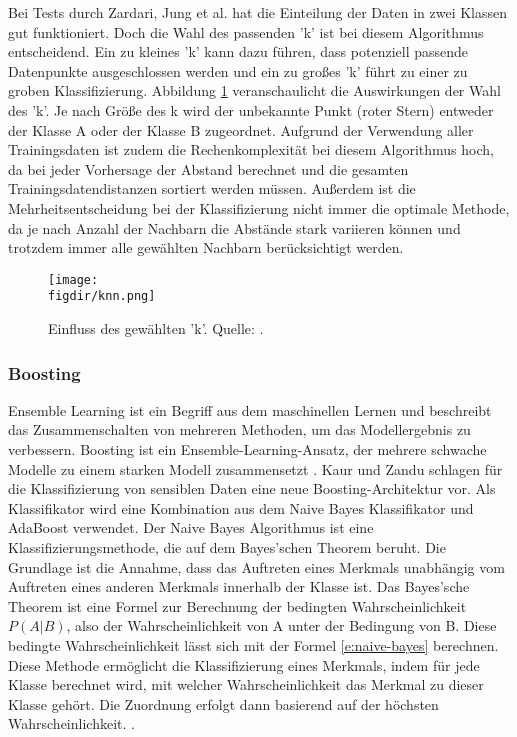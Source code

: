 Bei Tests durch Zardari, Jung et al. \cite{Zardari.2014} hat die Einteilung der Daten in zwei Klassen gut funktioniert. Doch die Wahl des passenden 'k' ist bei diesem Algorithmus entscheidend. Ein zu kleines 'k' kann dazu führen, dass potenziell passende Datenpunkte ausgeschlossen werden und ein zu großes 'k' führt zu einer zu groben Klassifizierung. Abbildung \ref{f:knn} veranschaulicht die Auswirkungen der Wahl des 'k'. Je nach Größe des k wird der unbekannte Punkt (roter Stern) entweder der Klasse A oder der Klasse B zugeordnet. Aufgrund der Verwendung aller Trainingsdaten ist zudem die Rechenkomplexität bei diesem Algorithmus hoch, da bei jeder Vorhersage der Abstand berechnet und die gesamten Trainingsdatendistanzen sortiert werden müssen. Außerdem ist die Mehrheitsentscheidung bei der Klassifizierung nicht immer die optimale Methode, da je nach Anzahl der Nachbarn die Abstände stark variieren können und trotzdem immer alle gewählten Nachbarn berücksichtigt werden.

\begin{figure}[htbp]
    \centering
    \texttt{[image: \\figdir/knn.png]}
    \caption{Einfluss des gewählten 'k'. Quelle: \cite{Shah.03.03.2021}.}
    \label{f:knn}
\end{figure}


\subsubsection{Boosting}
Ensemble Learning ist ein Begriff aus dem maschinellen Lernen und beschreibt das Zusammenschalten von mehreren Methoden, um das Modellergebnis zu verbessern. Boosting ist ein Ensemble-Learning-Ansatz, der mehrere schwache Modelle zu einem starken Modell zusammensetzt \cite{Frochte.2018c}.
Kaur und Zandu \cite{Kaur.2016} schlagen für die Klassifizierung von sensiblen Daten eine neue Boosting-Architektur vor. Als Klassifikator wird eine Kombination aus dem Naive Bayes Klassifikator und AdaBoost verwendet. Der Naive Bayes Algorithmus ist eine Klassifizierungsmethode, die auf dem  Bayes'schen Theorem beruht. Die Grundlage ist die Annahme, dass das Auftreten eines Merkmals unabhängig vom Auftreten eines anderen Merkmals innerhalb der Klasse ist. Das  Bayes'sche Theorem ist eine Formel zur Berechnung der bedingten Wahrscheinlichkeit ${P(A|B)}$, also der Wahrscheinlichkeit von A unter der Bedingung von B. Diese bedingte Wahrscheinlichkeit lässt sich mit der Formel \ref{e:naive-bayes} berechnen. Diese Methode ermöglicht die Klassifizierung eines Merkmals, indem für jede Klasse berechnet wird, mit welcher Wahrscheinlichkeit das Merkmal zu dieser Klasse gehört. Die Zuordnung erfolgt dann basierend auf der höchsten Wahrscheinlichkeit. \cite{Frochte.2018d}.

